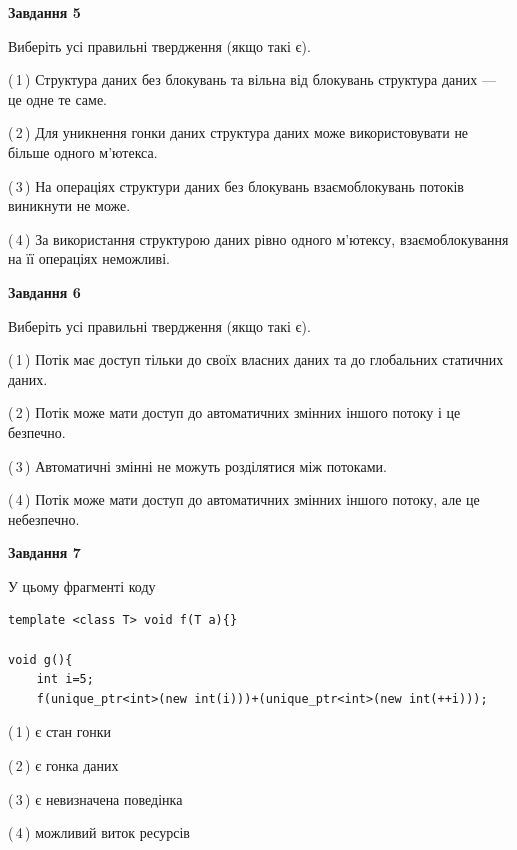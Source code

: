 \documentclass[12pt, ukrainian]{article}
\begin{document}
\begin {large}
{\begin{center}
\textbf{Завдання 5}
\end{center}

Виберіть усі правильні твердження (якщо такі є).\par
\vspace{2mm}

(\,1\,) Структура даних без блокувань та вільна від блокувань структура даних --- це одне те саме.%

(\,2\,) Для уникнення гонки даних структура даних може використовувати не більше одного м’ютекса.%

(\,3\,) На операціях структури даних без блокувань взаємоблокувань потоків виникнути не може.%

(\,4\,) За використання структурою даних рівно одного м’ютексу, взаємоблокування на її операціях неможливі.%
\newpage


\begin{center}
\textbf{Завдання 6}
\end{center}

Виберіть усі правильні твердження (якщо такі є).\par
\vspace{2mm}

(\,1\,) Потік має доступ тільки до своїх власних даних та до глобальних статичних даних.%

(\,2\,) Потік може мати доступ до автоматичних змінних іншого потоку і це безпечно.%

(\,3\,) Автоматичні змінні не можуть розділятися між потоками.%

(\,4\,) Потік може мати доступ до автоматичних змінних іншого потоку, але це небезпечно.%


\begin{center}
\textbf{Завдання 7}
\end{center}

У цьому фрагменті коду
\begin{verbatim}
template <class T> void f(T a){}

void g(){
    int i=5;
    f(unique_ptr<int>(new int(i)))+(unique_ptr<int>(new int(++i)));
\end{verbatim}
(\,1\,) є стан гонки%

(\,2\,) є гонка даних%

(\,3\,) є невизначена поведінка%

(\,4\,) можливий виток ресурсів%

}
\end {large}

\vspace{4mm}
\newpage
\end{document}
